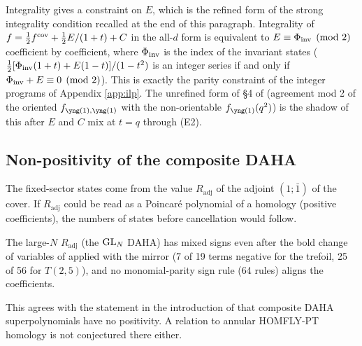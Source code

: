 Integrality gives a constraint on $E$, which is the refined form of the strong integrality condition recalled at the end of this paragraph. Integrality of $f = \tfrac12 f^{\mathrm{cov}} + \tfrac12 E/(1+t) + C$ in the all-$d$ form is equivalent to $E \equiv \Phi_{\mathrm{inv}} \pmod 2$ coefficient by coefficient, where $\Phi_{\mathrm{inv}}$ is the index of the invariant states ($\tfrac12[\Phi_{\mathrm{inv}}(1+t) + E(1-t)]/(1-t^2)$ is an integer series if and only if $\Phi_{\mathrm{inv}} + E \equiv 0 \pmod 2$). This is exactly the parity constraint of the integer programs of Appendix \ref{app:ilp}. The unrefined form of \S4 of \cite{AgSc12} (agreement mod 2 of the oriented $f_{\yone,\yone}$ with the non-orientable $f_{\yone}(q^2)$) is the shadow of this after $E$ and $C$ mix at $t = q$ through (E2).

\subsection{Non-positivity of the composite DAHA}\label{sec:composite}
The fixed-sector states come from the value $R_{\mathrm{adj}}$ of the adjoint $(1;\bar1)$ of the cover. If $R_{\mathrm{adj}}$ could be read as a Poincar\'e polynomial of a homology (positive coefficients), the numbers of states before cancellation would follow.
\begin{result}[negative]\label{cr:adjpos}
The large-$N$ $R_{\mathrm{adj}}$ (the $\mathrm{GL}_N$ DAHA) has mixed signs even after the bold change of variables of \cite{KN17} applied with the mirror (7 of 19 terms negative for the trefoil, 25 of 56 for $T(2,5)$), and no monomial-parity sign rule (64 rules) aligns the coefficients.
\end{result}
This agrees with the statement in the introduction of \cite{CE15} that composite DAHA superpolynomials have no positivity. A relation to annular HOMFLY-PT homology is not conjectured there either.
